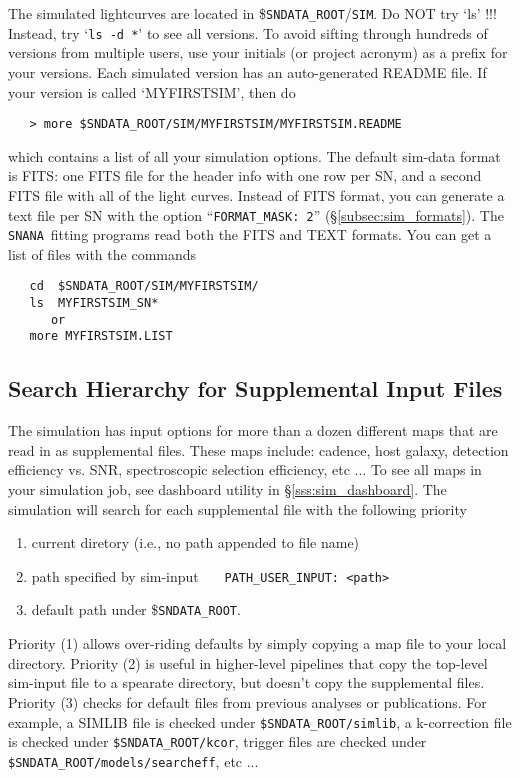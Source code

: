 \documentclass[12pt]{article}
\newcommand{\snana}{{\tt SNANA}}
\newcommand{\sndataroot}{{\tt SNDATA\_ROOT}}
\begin{document}
{The simulated lightcurves are located in
\$\sndataroot/{\tt SIM}. Do NOT try `ls' !!!
Instead, try `{\tt ls~-d *}' to see all versions.
To avoid sifting through hundreds of versions from multiple
users, use your initials (or project acronym) as a prefix 
for your versions.
%
Each simulated version has an auto-generated README file. 
If your version is called `MYFIRSTSIM', then do
\begin{verbatim}
   > more $SNDATA_ROOT/SIM/MYFIRSTSIM/MYFIRSTSIM.README
\end{verbatim}
%
which contains a list of all your simulation options.
The default sim-data format is FITS: one FITS file for the
header info with one row per SN, and a second FITS
file with all of the light curves. 
Instead of FITS format, you can generate a text file per SN
with the option ``{\tt FORMAT\_MASK: 2}'' 
(\S\ref{subsec:sim_formats}).
The \snana\ fitting programs read both the FITS and TEXT formats.
You can get a list of files with the commands
%
\begin{verbatim}
   cd  $SNDATA_ROOT/SIM/MYFIRSTSIM/
   ls  MYFIRSTSIM_SN*
      or
   more MYFIRSTSIM.LIST
\end{verbatim}


   \subsection{Search Hierarchy for Supplemental Input Files}
   \label{subsec:sim_inpfiles}

The simulation has input options for more than a dozen different 
maps that are read in as supplemental files. These maps include:
cadence, host galaxy, detection efficiency vs. SNR, 
spectroscopic selection efficiency, etc ...
To see all maps in your simulation job, 
see dashboard utility in \S\ref{sss:sim_dashboard}.
The simulation will search for each supplemental file with
the following priority
\begin{enumerate}[noitemsep]
  \item current diretory (i.e., no path appended to file name)
  \item path specified by sim-input~~~ {\tt PATH\_USER\_INPUT: <path>}
  \item default path under \$\sndataroot.
\end{enumerate}
%
Priority (1) allows over-riding defaults by
simply copying a map file to your local directory.
Priority (2) is useful in higher-level pipelines that
copy the top-level sim-input file to a spearate directory, 
but doesn't copy the supplemental files.
Priority (3) checks for default files from
previous analyses or publications. For example,
a SIMLIB file is checked under 
{\tt \$SNDATA\_ROOT/simlib},
a k-correction file is checked under
{\tt \$SNDATA\_ROOT/kcor},
trigger files are checked under
{\tt \$SNDATA\_ROOT/models/searcheff}, etc ...

}
\end{document}
